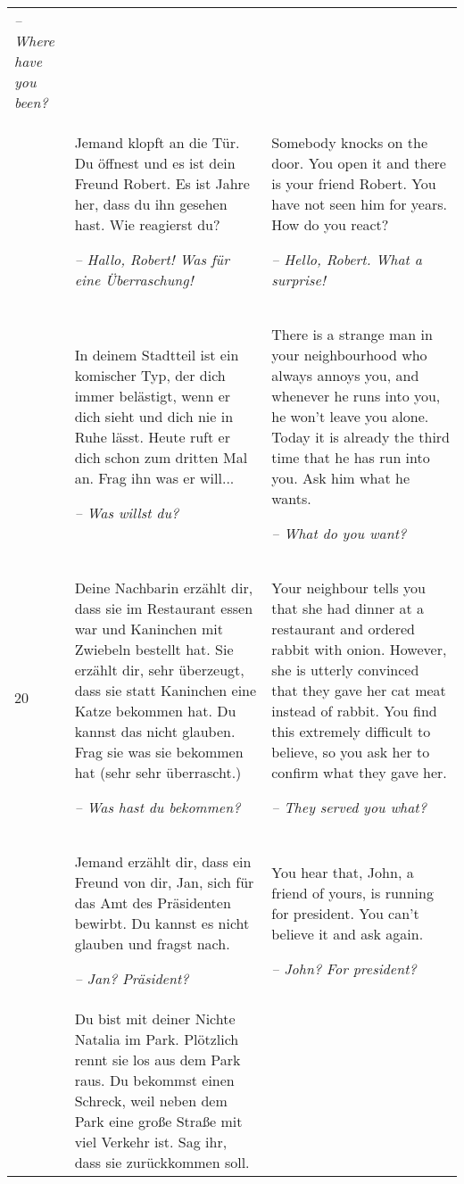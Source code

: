 \begin{xltabular}{\textwidth}{lQQ}
{\itshape -- Where have you been?}\\
 & Jemand klopft an die Tür. Du öffnest und es ist dein Freund Robert. Es ist Jahre her, dass du ihn gesehen hast. Wie reagierst du?

\textit{-- Hallo, Robert! Was für eine Überraschung!} & Somebody knocks on the door. You open it and there is your friend Robert. You have not seen him for years. How do you react?

{\itshape -- Hello, Robert. What a surprise!}\\
 & In deinem Stadtteil ist ein komischer Typ, der dich immer belästigt, wenn er dich sieht und dich nie in Ruhe lässt. Heute ruft er dich schon zum dritten Mal an. Frag ihn was er will...

\textit{-- Was willst du?} & There is a strange man in your neighbourhood who always annoys you, and whenever he runs into you, he won’t leave you alone. Today it is already the third time that he has run into you. Ask him what he wants.

{\itshape -- What do you want?}\\
20 & Deine Nachbarin erzählt dir, dass sie im Restaurant essen war und Kaninchen mit Zwiebeln bestellt hat. Sie erzählt dir, sehr überzeugt, dass sie statt Kaninchen eine Katze bekommen hat. Du kannst das nicht glauben. Frag sie was sie bekommen hat (sehr sehr überrascht.)

\textit{-- Was hast du bekommen?} & Your neighbour tells you that she had dinner at a restaurant and ordered rabbit with onion. However, she is utterly convinced that they gave her cat meat instead of rabbit. You find this extremely difficult to believe, so you ask her to confirm what they gave her.

{\itshape -- They served you what?}\\
 & Jemand erzählt dir, dass ein Freund von dir, Jan, sich für das Amt des Präsidenten bewirbt. Du kannst es nicht glauben und fragst nach.

\textit{-- Jan? Präsident?} & You hear that, John, a friend of yours, is running for president. You can’t believe it and ask again.

{\itshape -- John? For president?}\\
 & Du bist mit deiner Nichte Natalia im Park. Plötzlich rennt sie los aus dem Park raus. Du bekommst einen Schreck, weil neben dem Park eine große Straße mit viel Verkehr ist. Sag ihr, dass sie zurückkommen soll.


\end{xltabular}
